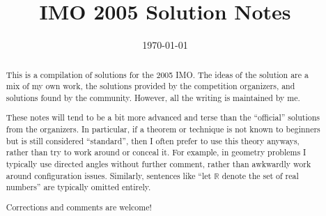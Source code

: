 \documentclass[11pt]{scrartcl}
\title{IMO 2005 Solution Notes}
\date{\today}
\begin{document}
\maketitle

\begin{abstract}
This is a compilation of solutions
for the 2005 IMO.
The ideas of the solution are a mix of my own work,
the solutions provided by the competition organizers,
and solutions found by the community.
However, all the writing is maintained by me.

These notes will tend to be a bit more advanced and terse than the ``official''
solutions from the organizers.
In particular, if a theorem or technique is not known to beginners
but is still considered ``standard'', then I often prefer to
use this theory anyways, rather than try to work around or conceal it.
For example, in geometry problems I typically use directed angles
without further comment, rather than awkwardly work around configuration issues.
Similarly, sentences like ``let $\mathbb{R}$ denote the set of real numbers''
are typically omitted entirely.

Corrections and comments are welcome!
\end{abstract}

\tableofcontents
\newpage

\addtocounter{section}{-1}
\end{document}
